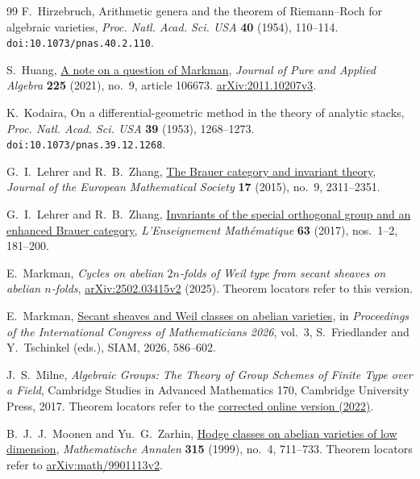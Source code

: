 \documentclass[11pt]{article}
\numberwithin{equation}{section}
\begin{document}
\begin{thebibliography}{99}
F.~Hirzebruch,
Arithmetic genera and the theorem of Riemann--Roch for algebraic varieties,
\emph{Proc. Natl. Acad. Sci. USA} \textbf{40} (1954), 110--114.
\texttt{doi:10.1073/pnas.40.2.110}.

S.~Huang,
\href{https://doi.org/10.1016/j.jpaa.2021.106673}
{A note on a question of Markman},
\emph{Journal of Pure and Applied Algebra} \textbf{225} (2021),
no.~9, article 106673.
\href{https://arxiv.org/abs/2011.10207v3}{arXiv:2011.10207v3}.

K.~Kodaira,
On a differential-geometric method in the theory of analytic stacks,
\emph{Proc. Natl. Acad. Sci. USA} \textbf{39} (1953), 1268--1273.
\texttt{doi:10.1073/pnas.39.12.1268}.

G.~I.~Lehrer and R.~B.~Zhang,
\href{https://doi.org/10.4171/JEMS/558}{The Brauer category and invariant theory},
\emph{Journal of the European Mathematical Society} \textbf{17} (2015), no.~9, 2311--2351.

G.~I.~Lehrer and R.~B.~Zhang,
\href{https://doi.org/10.4171/LEM/63-1/2-6}{Invariants of the special orthogonal group and an enhanced Brauer category},
\emph{L'Enseignement Math\'ematique} \textbf{63} (2017), nos.~1--2, 181--200.

E.~Markman,
\emph{Cycles on abelian $2n$-folds of Weil type from secant sheaves on abelian $n$-folds},
\href{https://arxiv.org/abs/2502.03415v2}{arXiv:2502.03415v2} (2025).
Theorem locators refer to this version.

E.~Markman,
\href{https://doi.org/10.1137/25M1803796}{Secant sheaves and Weil classes on abelian varieties},
in \emph{Proceedings of the International Congress of Mathematicians 2026},
vol.~3, S.~Friedlander and Y.~Tschinkel (eds.), SIAM, 2026, 586--602.

J.~S.~Milne,
\emph{Algebraic Groups: The Theory of Group Schemes of Finite Type over a Field},
Cambridge Studies in Advanced Mathematics 170, Cambridge University Press, 2017.
Theorem locators refer to the
\href{https://www.jmilne.org/math/Books/iAG2022.pdf}{corrected online version (2022)}.

B.~J.~J.~Moonen and Yu.~G.~Zarhin,
\href{https://doi.org/10.1007/s002080050333}{Hodge classes on abelian varieties of low dimension},
\emph{Mathematische Annalen} \textbf{315} (1999), no.~4, 711--733.
Theorem locators refer to
\href{https://arxiv.org/abs/math/9901113v2}{arXiv:math/9901113v2}.


\end{thebibliography}
\end{document}
